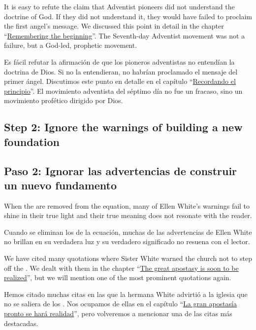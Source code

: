It is easy to refute the claim that Adventist pioneers did not understand the doctrine of God. If they did not understand it, they would have failed to proclaim the first angel’s message. We discussed this point in detail in the chapter “\hyperref[chap:remembering-the-beginning]{Remembering the beginning}”. The Seventh-day Adventist movement was not a failure, but a God-led, prophetic movement.


Es fácil refutar la afirmación de que los pioneros adventistas no entendían la doctrina de Dios. Si no la entendieran, no habrían proclamado el mensaje del primer ángel. Discutimos este punto en detalle en el capítulo “\hyperref[chap:remembering-the-beginning]{Recordando el principio}”. El movimiento adventista del séptimo día no fue un fracaso, sino un movimiento profético dirigido por Dios.


\subsection*{Step 2: Ignore the warnings of building a new foundation}


\subsection*{Paso 2: Ignorar las advertencias de construir un nuevo fundamento}


When the  are removed from the equation, many of Ellen White’s warnings fail to shine in their true light and their true meaning does not resonate with the reader.


Cuando se eliminan los  de la ecuación, muchas de las advertencias de Ellen White no brillan en su verdadera luz y su verdadero significado no resuena con el lector.


We have cited many quotations where Sister White warned the church not to step off the . We dealt with them in the chapter “\hyperref[chap:apostasy]{The great apostasy is soon to be realized}”, but we will mention one of the most prominent quotations again.


Hemos citado muchas citas en las que la hermana White advirtió a la iglesia que no se saliera de los . Nos ocupamos de ellas en el capítulo “\hyperref[chap:apostasy]{La gran apostasía pronto se hará realidad}”, pero volveremos a mencionar una de las citas más destacadas.


